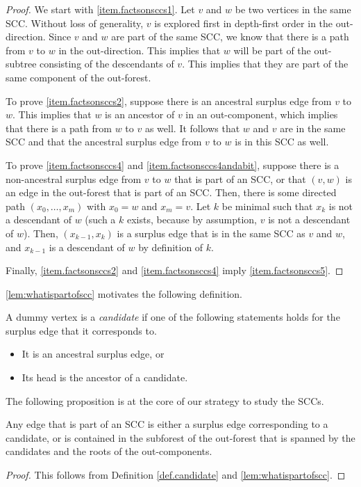 \begin{proof}
We start with \ref{item.factsonsccs1}. Let $v$ and $w$ be two vertices in the same SCC. Without loss of generality, $v$ is explored first in depth-first order in the out-direction. Since $v$ and $w$ are part of the same SCC, we know that there is a path from $v$ to $w$ in the out-direction. This implies that $w$ will be part of the out-subtree consisting of the descendants of $v$. This implies that they are part of the same component of the out-forest.

To prove \ref{item.factsonsccs2}, suppose there is an ancestral surplus edge from $v$ to $w$. This implies that $w$ is an ancestor of $v$ in an out-component, which implies that there is a path from $w$ to $v$ as well. It follows that $w$ and $v$ are in the same SCC and that the ancestral surplus edge from $v$ to $w$ is in this SCC as well. 

To prove \ref{item.factsonsccs4} and \ref{item.factsonsccs4andabit}, suppose there is a non-ancestral surplus edge from $v$ to $w$ that is part of an SCC, or that $(v,w)$ is an edge in the out-forest that is part of an SCC. Then, there is some directed path $(x_0,\dots, x_m)$ with $x_0=w$ and $x_m=v$. Let $k$ be minimal such that $x_k$ is not a descendant of $w$ (such a $k$ exists, because by assumption, $v$ is not a descendant of $w$). Then, $(x_{k-1},x_k)$ is a surplus edge that is in the same SCC as $v$ and $w$, and $x_{k-1}$ is a descendant of $w$ by definition of $k$.


Finally, \ref{item.factsonsccs2} and \ref{item.factsonsccs4} imply \ref{item.factsonsccs5}. 
\end{proof}
 \cref{lem:whatispartofscc} motivates the following definition.
\begin{definition}\label{def.candidate}
A dummy vertex is a \emph{candidate} if one of the following statements holds for the surplus edge that it corresponds to. 
\begin{itemize}
    \item It is an ancestral surplus edge, or
    \item Its head is the ancestor of a candidate.
\end{itemize}
\end{definition}
The following proposition is at the core of our strategy to study the SCCs.
\begin{proposition}\label{prop:edgesinSCCs}
Any edge that is part of an SCC is either a surplus edge corresponding to a candidate, or is contained in the subforest of the out-forest that is spanned by the candidates and the roots of the out-components.
\end{proposition}
\begin{proof}
This follows from Definition \ref{def.candidate} and \cref{lem:whatispartofscc}.
\end{proof}

